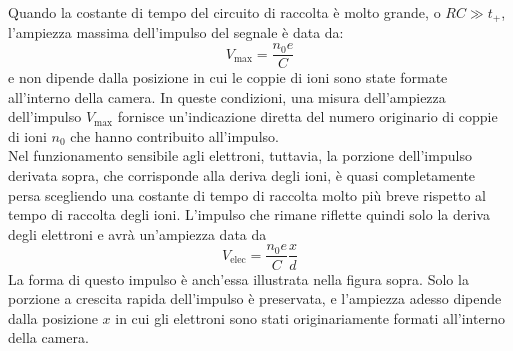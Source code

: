 \begin{approfondimento}
\begin{figure}[H]
   \end{figure}
   Quando la costante di tempo del circuito di raccolta è molto grande, o $RC \gg t_{+}$, l'ampiezza massima dell'impulso del segnale è data da:
   \begin{equation*}
      V_{\text{max}}=\frac{n_0 e}{C}
   \end{equation*}
   e non dipende dalla posizione in cui le coppie di ioni sono state formate all'interno della camera. In queste condizioni, una misura dell'ampiezza dell'impulso $ V_{\text{max}} $ fornisce un'indicazione diretta del numero originario di coppie di ioni $n_0$ che hanno contribuito all'impulso.\\
   Nel funzionamento sensibile agli elettroni, tuttavia, la porzione dell'impulso derivata sopra, che corrisponde alla deriva degli ioni, è quasi completamente persa scegliendo una costante di tempo di raccolta molto più breve rispetto al tempo di raccolta degli ioni. L'impulso che rimane riflette quindi solo la deriva degli elettroni e avrà un'ampiezza data da
   \begin{equation*}
      V_{\text{elec}}=\frac{n_0 e}{C} \frac{x}{d}
   \end{equation*}
   La forma di questo impulso è anch'essa illustrata nella figura sopra. Solo la porzione a crescita rapida dell'impulso è preservata, e l'ampiezza adesso dipende dalla posizione $x$ in cui gli elettroni sono stati originariamente formati all'interno della camera.
\end{approfondimento}

